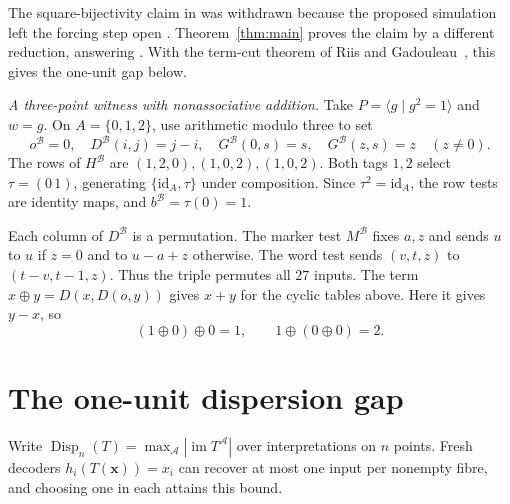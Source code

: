 \documentclass[a4paper,11pt]{article}
\DeclareMathOperator{\Disp}{Disp}
\newcommand{\id}{\mathrm{id}}
\newcommand{\A}{\mathcal A}
\begin{document}
The square-bijectivity claim in \cite[Theorem~7.1]{early} was withdrawn because the proposed simulation left the forcing step open \cite[Remark~7.1]{TC}. Theorem~\ref{thm:main} proves the claim by a different reduction, answering \cite[Problem~6.1]{TC}. With the term-cut theorem of Riis and Gadouleau~\cite{RG}, this gives the one-unit gap below.

\newpage
\noindent\emph{A three-point witness with nonassociative addition.}
Take \(P=\langle g\mid g^2=1\rangle\) and \(w=g\). On \(A=\{0,1,2\}\), use arithmetic modulo three to set
\[
 o^{\mathcal B}=0,\quad D^{\mathcal B}(i,j)=j-i,\quad G^{\mathcal B}(0,s)=s,\quad
 G^{\mathcal B}(z,s)=z\quad(z\ne0).
\]
The rows of \(H^{\mathcal B}\) are \((1,2,0),(1,0,2),(1,0,2)\). Both tags \(1,2\) select \(\tau=(0\,1)\), generating \(\{\id_A,\tau\}\) under composition. Since \(\tau^2=\id_A\), the row tests are identity maps, and \(b^{\mathcal B}=\tau(0)=1\).

Each column of \(D^{\mathcal B}\) is a permutation. The marker test \(M^{\mathcal B}\) fixes \(a,z\) and sends \(u\) to \(u\) if \(z=0\) and to \(u-a+z\) otherwise. The word test sends \((v,t,z)\) to \((t-v,t-1,z)\). Thus the triple permutes all \(27\) inputs. The term \(x\oplus y=D(x,D(o,y))\) gives \(x+y\) for the cyclic tables above. Here it gives \(y-x\), so
\[
                 (1\oplus0)\oplus0=1,\qquad 1\oplus(0\oplus0)=2.
\]

\section{The one-unit dispersion gap}
Write \(\Disp_n(T)=\max_\A|\operatorname{im}T^\A|\) over interpretations on \(n\) points. Fresh decoders \(h_i(T(\mathbf x))=x_i\) can recover at most one input per nonempty fibre, and choosing one in each attains this bound.
\end{document}
